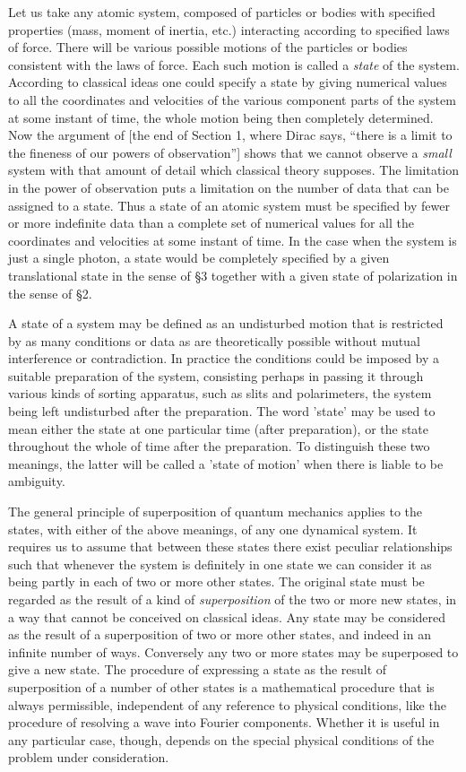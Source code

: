 Let us take any atomic system, composed of particles or bodies with specified properties (mass, moment of inertia, etc.) interacting according to specified laws of force.  There will be various possible motions of the particles or bodies consistent with the laws of force.  Each such motion is called a \emph{state} of the system.  According to classical ideas one could specify a state by giving numerical values to all the coordinates and velocities of the various component parts of the system at some instant of time, the whole motion being then completely determined.  Now the argument of [the end of Section 1, where Dirac says, ``there is a limit to the fineness of our powers of observation''] shows that we cannot observe a \emph{small} system with that amount of detail which classical theory supposes.  The limitation in the power of observation puts a limitation on the number of data that can be assigned to a state.  Thus a state of an atomic system must be specified by fewer or more indefinite data than a complete set of numerical values for all the coordinates and velocities at some instant of time.  In the case when the system is just a single photon, a state would be completely specified by a given translational state in the sense of \S 3 together with a given state of polarization in the sense of \S 2.

A state of a system may be defined as an undisturbed motion that is restricted by as many conditions or data as are theoretically possible without mutual interference or contradiction.  In practice the conditions could be imposed by a suitable preparation of the system, consisting perhaps in passing it through various kinds of sorting apparatus, such as slits and polarimeters, the system being left undisturbed after the preparation.  The word 'state' may be used to mean either the state at one particular time (after preparation), or the state throughout the whole of time after the preparation.  To distinguish these two meanings, the latter will be called a 'state of motion' when there is liable to be ambiguity.

The general principle of superposition of quantum mechanics applies to the states, with either of the above meanings, of any one dynamical system.  It requires us to assume that between these states there exist peculiar relationships such that whenever the system is definitely in one state we can consider it as being partly in each of two or more other states.  The original state must be regarded as the result of a kind of \emph{superposition} of the two or more new states, in a way that cannot be conceived on classical ideas.  Any state may be considered as the result of a superposition of two or more other states, and indeed in an infinite number of ways.  Conversely any two or more states may be superposed to give a new state.  The procedure of expressing a state as the result of superposition of a number of other states is a mathematical procedure that is always permissible, independent of any reference to physical conditions, like the procedure of resolving a wave into Fourier components.  Whether it is useful in any particular case, though, depends on the special physical conditions of the problem under consideration.

